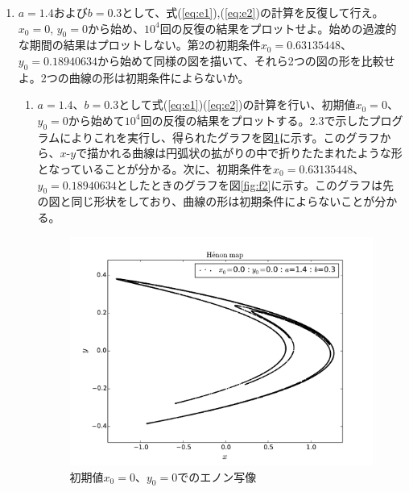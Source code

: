 \documentclass{jsarticle}
\begin{document}
        \begin{enumerate}
            \renewcommand{\labelenumi}{\alph{enumi}.}
            \renewcommand{\labelenumii}{}
            
            \item  $a=1.4$および$b=0.3$として、式(\ref{eq:e1}),(\ref{eq:e2})の計算を反復して行え。$x_{0}=0$, $y_{0}=0$から始め、$10^{4}$回の反復の結果をプロットせよ。始めの過渡的な期間の結果はプロットしない。第2の初期条件$x_{0}=0.63 135 448 $、$y_{0}=0.18 940 634 $から始めて同様の図を描いて、それら2つの図の形を比較せよ。2つの曲線の形は初期条件によらないか。   
                
                \begin{enumerate}
                    \item $a=1.4$、$b=0.3$として式(\ref{eq:e1})(\ref{eq:e2})の計算を行い、初期値$x_{0}=0$、$y_{0}=0$から始めて$10^{4}$回の反復の結果をプロットする。2.3で示したプログラムによりこれを実行し、得られたグラフを図\ref{fig:f1}に示す。このグラフから、$x$-$y$で描かれる曲線は円弧状の拡がりの中で折りたたまれたような形となっていることが分かる。次に、初期条件を$x_{0}=0.63 135 448 $、$y_{0}=0.18 940 634 $としたときのグラフを図\ref{fig:f2}に示す。このグラフは先の図と同じ形状をしており、曲線の形は初期条件によらないことが分かる。
                    \begin{figure}[H]
                        \begin{center}
                        \includegraphics[width=12.5cm]{figure_1.pdf}
                        \caption{初期値$x_{0}=0$、$y_{0}=0$でのエノン写像}
                        \label{fig:f1}
                    \end{center}
                    \end{figure}
                    

\end{enumerate}
\end{enumerate}
\end{document}

